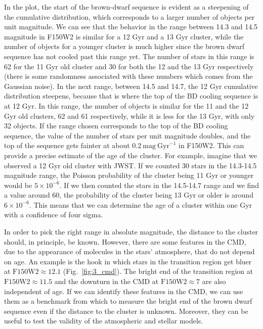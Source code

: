\documentclass[useAMS,usenatbib]{mnras}
\begin{document}
In the plot, the start of the brown-dwarf sequence is evident as a steepening of the cumulative distribution, which corresponds to a larger number of objects per unit magnitude. We can see that the behavior in the range between 14.3 and 14.5 magnitude in F150W2 is similar for a 12 Gyr and a 13 Gyr cluster, while the number of objects for a younger cluster is much higher since the brown dwarf sequence has not cooled past this range yet. The number of stars in this range is 62 for the 11 Gyr old cluster and 30 for both the 12 and the 13 Gyr respectively (there is some randomness associated with these numbers which comes from the Gaussian noise). In the next range, between 14.5 and 14.7, the 12 Gyr cumulative distribution steepens, because that is where the top of the BD cooling sequence is at 12 Gyr. In this range, the number of objects is similar for the 11 and the 12 Gyr old clusters, 62 and 61 respectively, while it is less for the 13 Gyr, with only 32 objects. If the range chosen corresponds to the top of the BD cooling sequence, the value of the number of stars per unit magnitude doubles, and the top of the sequence gets fainter at about $0.2~\mathrm{mag~Gyr}^{-1}$ in F150W2. This can provide a precise estimate of the age of the cluster. For example, imagine that we observed a 12 Gyr old cluster with JWST. If we counted 30 stars in the 14.3-14.5 magnitude range, the Poisson probability of the cluster being 11 Gyr or younger would be $5\times 10^{-6}$. If we then counted the stars in the 14.5-14.7 range and we find a value around 60, the probability of the cluster being 13 Gyr or older is around $6\times10^{-6}$.  This means that we can determine the age of a cluster within one Gyr with a confidence of four sigma.

In order to pick the right range in absolute magnitude, the distance to the cluster should, in principle, be known.  However, there are some features in the CMD, due to the appearance of molecules in the stars' atmosphere, that do not depend on age.  An example is the hook in which stars in the transition region get bluer at $\mathrm{F150W2} \approx 12.1$ (Fig.~\ref{fig:3_cmd}).   The bright end of the transition region at $\mathrm{F150W2} \approx 11.5$ and the downturn in the CMD at $\mathrm{F150W2}\approx 7$ \citep{2016ApJ...823...18C} are also independent of age. If we can identify these features in the CMD, we can use them as a benchmark from which to measure the bright end of the brown dwarf sequence even if the distance to the cluster is unknown. Moreover, they can be useful to test the validity of the atmospheric and stellar models.
\end{document}
